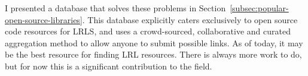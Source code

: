 I presented a database that solves these problems in Section~\ref{subsec:popular-open-source-libraries}. This database explicitly caters exclusively to open source code resources for LRLS, and uses a crowd-sourced, collaborative and curated aggregation method to allow anyone to submit possible links. As of today, it may be the best resource for finding LRL resources. There is always more work to do, but for now this is a significant contribution to the field.  



